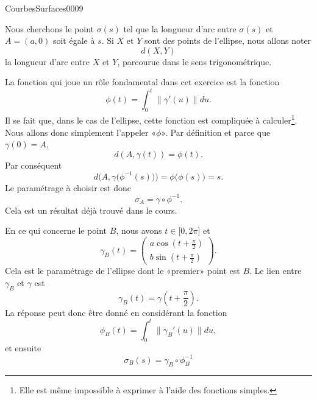 \begin{corrige}{CourbesSurfaces0009}

Nous cherchons le point \(\sigma(s)\) tel que la longueur d'arc entre \(\sigma(s)\) et \(A=(a,0)\) soit égale à \(s\). Si \(X\) et \(Y\) sont des points de l'ellipse, nous allons noter
\begin{equation}
    d(X,Y) 
\end{equation}
la longueur d'arc entre \(X\) et \(Y\), parcourue dans le sens trigonométrique.

La fonction qui joue un rôle fondamental dans cet exercice est la fonction
\begin{equation}
    \phi(t)=\int_0^t\| \gamma'(u) \|du.
\end{equation}
Il se fait que, dans le cas de l'ellipse, cette fonction est compliquée à calculer\footnote{Elle est même impossible à exprimer à l'aide des fonctions simples.}. Nous allons donc simplement l'appeler «\(\phi\)». Par définition et parce que \(\gamma(0)=A\),
\begin{equation}
    d(A,\gamma(t))=\phi(t).
\end{equation}
Par conséquent
\begin{equation}
    d\Big( A,\gamma\big( \phi^{-1}(s) \big) \Big)=\phi\big( \phi(s) \big)=s.
\end{equation}
Le paramétrage à choisir est donc
\begin{equation}
    \sigma_A=\gamma\circ\phi^{-1}.
\end{equation}
Cela est un résultat déjà trouvé dans le cours.

En ce qui concerne le point \(B\), nous avons \(t\in\mathopen[ 0 , 2\pi \mathclose]\) et
\begin{equation}
    \gamma_B(t)=\begin{pmatrix}
        a\cos(t+\frac{ \pi }{2})    \\ 
        b\sin(t+\frac{ \pi }{2})    
    \end{pmatrix}.
\end{equation}
Cela est le paramétrage de l'ellipse dont le «premier» point est \(B\). Le lien entre \(\gamma_B\) et \(\gamma\) est
\begin{equation}
    \gamma_B(t)=\gamma(t+\frac{ \pi }{2}).
\end{equation}
La réponse peut donc être donné en considérant la fonction
\begin{equation}
    \phi_B(t)=\int_0^t\| \gamma_B'(u) \|du,
\end{equation}
et ensuite
\begin{equation}        \label{EqReponseSigmaB}
    \sigma_B(s)=\gamma_B\circ\phi_B^{-1}
\end{equation}


\end{corrige}
